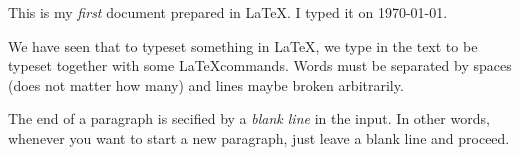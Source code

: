 \documentclass{article}
\begin{document}
This is my \emph{first} document prepared in \LaTeX. I typed it on \today.

We have seen that to typeset something in \LaTeX, we type in the
text to be typeset together with some \LaTeX commands.
Words must be separated by spaces (does not matter how many)
and lines maybe broken arbitrarily.

The end of a paragraph is secified by a \emph{blank line}
in the input. In other words, whenever you want to start a new
paragraph, just leave a blank line and proceed.
\end{document}
